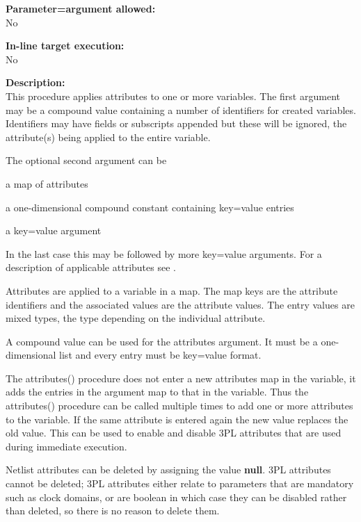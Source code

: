         {\bf Parameter=argument allowed:} \\
        No
        
        {\bf In-line target execution:} \\
        No
        
        {\bf Description:} \\
        This procedure applies attributes to one or more variables. The first
        argument may be a compound value containing a number of identifiers for
        created variables. Identifiers may have fields or subscripts appended
        but these will be ignored, the attribute(s) being applied to the
        entire variable.
        
        The optional second argument can be
        \blist
        \item   a map of attributes
        \item   a one-dimensional compound constant containing key=value entries
        \item   a key=value argument
        \blend
        
        In the last case this may be followed by more key=value arguments. For a
        description of applicable attributes see .
        
        Attributes are applied to a variable in a map. The map
        keys are the attribute identifiers and the associated values
        are the attribute values. The entry values are mixed types,
        the type depending on the individual attribute.

        A compound value can be used for the attributes argument. It
        must be a one-dimensional list and every entry must be
        key=value format.

        The attributes() procedure does not enter a new attributes map in
        the variable, it adds the entries in the argument map to that in the
        variable. Thus the attributes() procedure can be called multiple times
        to add one or more attributes to the variable. If the same attribute is
        entered again the new value replaces the old value. This can be used to
        enable and disable 3PL attributes that are used during immediate
        execution.

        Netlist attributes can be deleted by assigning the value {\bf null}.
        3PL attributes cannot be deleted; 3PL attributes either
        relate to parameters that are mandatory such as clock domains, or are
        boolean in which case they can be disabled rather than deleted, so
        there is no reason to delete them.
        
